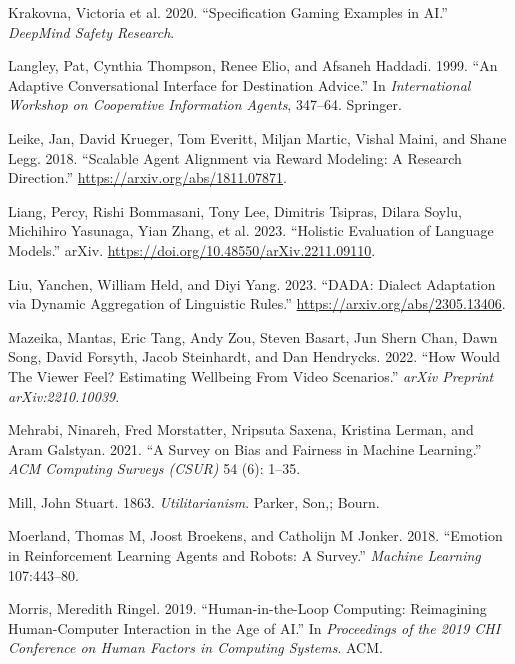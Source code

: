 \documentclass[
  letterpaper,
  numbers=noenddot,
  DIV=11]{scrreprt}
\newlength{\cslhangindent}
\newenvironment{CSLReferences}[2] %
 {\begin{list}{}{%
  \setlength{\itemindent}{0pt}
  \setlength{\leftmargin}{0pt}
  \setlength{\parsep}{0pt}
  \ifodd #1
   \setlength{\leftmargin}{\cslhangindent}
   \setlength{\itemindent}{-1\cslhangindent}
  \fi
  \setlength{\itemsep}{#2\baselineskip}}}
 {\end{list}}
\theoremstyle{definition}
\theoremstyle{plain}
\theoremstyle{plain}
\theoremstyle{remark}
\begin{document}
\begin{CSLReferences}{1}{0}
Krakovna, Victoria et al. 2020. {``Specification Gaming Examples in
AI.''} \emph{DeepMind Safety Research}.

Langley, Pat, Cynthia Thompson, Renee Elio, and Afsaneh Haddadi. 1999.
{``An Adaptive Conversational Interface for Destination Advice.''} In
\emph{International Workshop on Cooperative Information Agents},
347--64. Springer.

Leike, Jan, David Krueger, Tom Everitt, Miljan Martic, Vishal Maini, and
Shane Legg. 2018. {``Scalable Agent Alignment via Reward Modeling: A
Research Direction.''} \url{https://arxiv.org/abs/1811.07871}.

Liang, Percy, Rishi Bommasani, Tony Lee, Dimitris Tsipras, Dilara Soylu,
Michihiro Yasunaga, Yian Zhang, et al. 2023. {``Holistic {Evaluation} of
{Language} {Models}.''} arXiv.
\url{https://doi.org/10.48550/arXiv.2211.09110}.

Liu, Yanchen, William Held, and Diyi Yang. 2023. {``DADA: Dialect
Adaptation via Dynamic Aggregation of Linguistic Rules.''}
\url{https://arxiv.org/abs/2305.13406}.

Mazeika, Mantas, Eric Tang, Andy Zou, Steven Basart, Jun Shern Chan,
Dawn Song, David Forsyth, Jacob Steinhardt, and Dan Hendrycks. 2022.
{``How {Would} {The} {Viewer} {Feel}? {Estimating} {Wellbeing} {From}
{Video} {Scenarios}.''} \emph{arXiv Preprint arXiv:2210.10039}.

Mehrabi, Ninareh, Fred Morstatter, Nripsuta Saxena, Kristina Lerman, and
Aram Galstyan. 2021. {``A Survey on Bias and Fairness in Machine
Learning.''} \emph{ACM Computing Surveys (CSUR)} 54 (6): 1--35.

Mill, John Stuart. 1863. \emph{Utilitarianism}. Parker, Son,; Bourn.

Moerland, Thomas M, Joost Broekens, and Catholijn M Jonker. 2018.
{``Emotion in Reinforcement Learning Agents and Robots: A Survey.''}
\emph{Machine Learning} 107:443--80.

Morris, Meredith Ringel. 2019. {``Human-in-the-Loop Computing:
Reimagining Human-Computer Interaction in the Age of AI.''} In
\emph{Proceedings of the 2019 CHI Conference on Human Factors in
Computing Systems}. ACM.


\end{CSLReferences}
\end{document}
